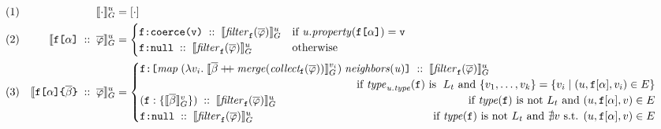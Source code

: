 

\begin{figure}[t]
\small
    \centering
    \begin{align*}
    & (1) & \eval{\cdot}{u} &= [\cdot] \\
    & (2) & \evalu{\fld\; ::\; \queries} &= \begin{cases}
        \resp{\texttt{coerce(\val)}} \; ::\; \evalfilteru{\queries}{\fkey}  
        & \text{if } \mathit{u.property}(\fld) = \val \\
        \resp{\nval} \; :: \; \evalfilteru{\queries}{\fkey} 
        & \text{otherwise}
    \end{cases}\\
    & (3) & \evalu{\nfld{\overline{\beta}} \; ::\; \queries} &=
    \begin{cases}
        \resp{\texttt{[} \mathit{map}\; (\lambda v_{i}.\; \eval{\overline{\beta} \mdoubleplus \mathit{merge (collect_\fkey (\queries))}}{v_{i}})\; \mathit{neighbors(u)} \texttt{]}} \; :: \; \evalfilteru{\queries}{\fkey} \\  
        \hfill \text{ if } 
            \mathit{type}_{\mathit{u.type}}(\fkey) \text{ is } \; L_{t} \text{ and } \{v_{1}, \ldots, v_{k}\} = 
        \{v_{i} \mid (u, \fkey[\alpha], v_{i}) \in E\} \\
    (\fkey:\{\eval{\subqueries{\beta}}{v}\})\; :: \; \evalfilteru{\queries}{\fkey}  
        \hfill \text{ if } 
        \mathit{type(\fkey)} \text{ is not } L_{t} \text{ and } (u, \fkey[\alpha], v) \in E \\
    \resp{\nval}\; :: \; \evalfilteru{\queries}{\fkey} 
    \qquad \qquad \qquad \qquad \qquad \qquad \qquad \qquad
    \text{ if } \mathit{type(\fkey)} \text{ is not } L_{t}  \text{ and } \nexists v \text{ s.t. }  (u, \fkey[\alpha], v) \in E \\

\end{cases}
\end{align*}
\end{figure}
